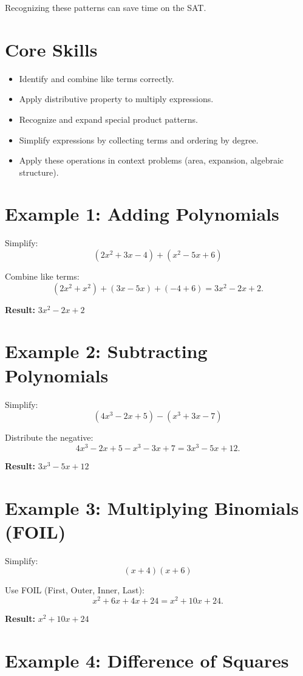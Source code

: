 \documentclass[12pt]{article}
\begin{document}
Recognizing these patterns can save time on the SAT.

\section*{Core Skills}
\begin{itemize}
  \item Identify and combine like terms correctly.
  \item Apply distributive property to multiply expressions.
  \item Recognize and expand special product patterns.
  \item Simplify expressions by collecting terms and ordering by degree.
  \item Apply these operations in context problems (area, expansion, algebraic structure).
\end{itemize}

\section*{Example 1: Adding Polynomials}

Simplify:
\[
(2x^2 + 3x - 4) + (x^2 - 5x + 6)
\]

Combine like terms:
\[
(2x^2 + x^2) + (3x - 5x) + (-4 + 6) = 3x^2 - 2x + 2.
\]

\textbf{Result:} \(\boxed{3x^2 - 2x + 2}\)

\section*{Example 2: Subtracting Polynomials}

Simplify:
\[
(4x^3 - 2x + 5) - (x^3 + 3x - 7)
\]

Distribute the negative:
\[
4x^3 - 2x + 5 - x^3 - 3x + 7 = 3x^3 - 5x + 12.
\]

\textbf{Result:} \(\boxed{3x^3 - 5x + 12}\)

\section*{Example 3: Multiplying Binomials (FOIL)}

Simplify:
\[
(x + 4)(x + 6)
\]

Use FOIL (First, Outer, Inner, Last):
\[
x^2 + 6x + 4x + 24 = x^2 + 10x + 24.
\]

\textbf{Result:} \(\boxed{x^2 + 10x + 24}\)

\section*{Example 4: Difference of Squares}
\end{document}
